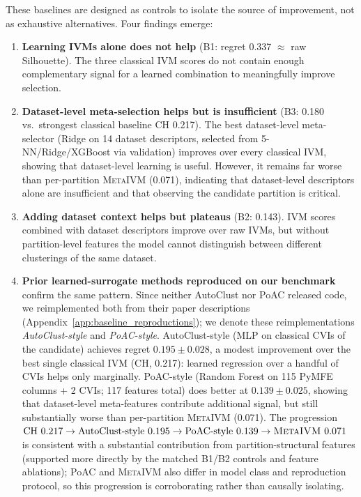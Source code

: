 \documentclass[10pt]{article} %
\newcommand{\ours}{\textsc{MetaIVM}}
\begin{document}
These baselines are designed as controls to isolate the source of improvement, not as exhaustive alternatives. Four findings emerge:
\begin{enumerate}
    \item \textbf{Learning IVMs alone does not help} (B1: regret 0.337 $\approx$ raw Silhouette). The three classical IVM scores do not contain enough complementary signal for a learned combination to meaningfully improve selection.
    \item \textbf{Dataset-level meta-selection helps but is insufficient} (B3: 0.180 vs.\ strongest classical baseline CH 0.217). The best dataset-level meta-selector (Ridge on 14 dataset descriptors, selected from 5-NN/Ridge/XGBoost via validation) improves over every classical IVM, showing that dataset-level learning is useful. However, it remains far worse than per-partition \ours{} (0.071), indicating that dataset-level descriptors alone are insufficient and that observing the candidate partition is critical.
    \item \textbf{Adding dataset context helps but plateaus} (B2: 0.143). IVM scores combined with dataset descriptors improve over raw IVMs, but without partition-level features the model cannot distinguish between different clusterings of the same dataset.
    \item \textbf{Prior learned-surrogate methods reproduced on our benchmark} confirm the same pattern. Since neither AutoClust nor PoAC released code, we reimplemented both from their paper descriptions (Appendix~\ref{app:baseline_reproductions}); we denote these reimplementations \emph{AutoClust-style} and \emph{PoAC-style}. AutoClust-style (MLP on classical CVIs of the candidate) achieves regret $0.195 \pm 0.028$, a modest improvement over the best single classical IVM (CH, 0.217): learned regression over a handful of CVIs helps only marginally. PoAC-style (Random Forest on 115 PyMFE columns + 2 CVIs; 117 features total) does better at $0.139 \pm 0.025$, showing that dataset-level meta-features contribute additional signal, but still substantially worse than per-partition \ours{} (0.071). The progression $\text{CH } 0.217 \to \text{AutoClust-style } 0.195 \to \text{PoAC-style } 0.139 \to \ours{}\ 0.071$ is consistent with a substantial contribution from partition-structural features (supported more directly by the matched B1/B2 controls and feature ablations); PoAC and \ours{} also differ in model class and reproduction protocol, so this progression is corroborating rather than causally isolating.
\end{enumerate}
\end{document}

